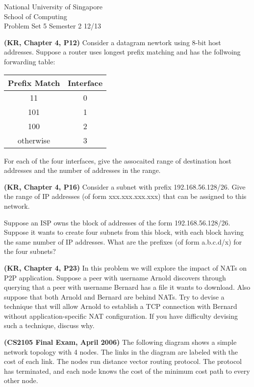 \documentclass[a4paper,11pt]{exam}
\begin{document}
    \extraheadheight{.5in}
    {\large\sf National University of Singapore\\ School of Computing \\
    \LARGE\sf Problem Set 5}%
    {\large\sf Semester 2 12/13}
    \firstpageheadrule
    \pagestyle{headandfoot}

    \begin{questions}
	\question \textbf{(KR, Chapter 4, P12)}
	Consider a datagram newtork using 8-bit host addresses. Suppose a 
	router uses longest prefix matching and has the follwoing forwarding
	table:

	\begin{center}
	\begin{tabular}{cc}
			Prefix Match & Interface\\
			\hline
			11 & 0\\
			101 & 1\\
			100 & 2\\
			otherwise & 3\\
			\hline
	\end{tabular}
	\end{center}

	For each of the four interfaces, give the assocaited range of 
	destination host addresses and the number of addresses in the range.

	\question \textbf{(KR, Chapter 4, P16)}
	Consider a subnet with prefix 192.168.56.128/26.  Give the
	range of IP addresses (of form xxx.xxx.xxx.xxx) that can
	be assigned to this network.

	Suppose an ISP owns the block of addresses of the form
	192.168.56.128/26.  Suppose it wants to create four subnets
	from this block, with each block having the same number of
	IP addresses.  What are the prefixes (of form a.b.c.d/x)
	for the four subnets?

	\question \textbf{(KR, Chapter 4, P23)}
	In this problem we will explore the impact of NATs on P2P
	application.
	Suppose a peer with username Arnold
	discovers through querying that a peer with username Bernard
	has a file it wants to download.  Also suppose that both
	Arnold and Bernard are behind NATs.  Try to devise a technique
	that will allow Arnold to establish a TCP connection with
	Bernard without application-specific NAT configuration.  If
	you have difficulty devising such a technique, discuss why.

	\question \textbf{(CS2105 Final Exam, April 2006)}
	The following diagram shows a simple network topology with 4 nodes.
	The links in the diagram are labeled with the cost of each link. 
	The nodes run distance vector routing protocol.  The protocol has
	terminated, and each node knows the cost of the minimum cost path
	to every other node.


\end{questions}
\end{document}
